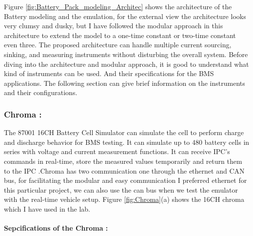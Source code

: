 Figure \ref{fig:Battery_Pack_modeling_Architec} shows the architecture of the Battery modeling and the emulation, for the external view the architecture looks very clumsy and dusky, but I have followed the modular approach in this architecture to extend the model to a one-time constant or two-time constant even three. The proposed architecture can handle multiple current sourcing, sinking, and measuring instruments without disturbing the overall system. Before diving into the architecture and modular approach, it is good to understand what kind of instruments can be used. And their specifications for the BMS applications. The following section can give brief information on the instruments and their configurations.

\subsubsection{Chroma :}
The 87001 16CH Battery Cell Simulator can simulate the cell to perform charge and discharge behavior for BMS testing. It can simulate up to 480 battery cells in series with voltage and current measurement functions. It can receive IPC's commands in real-time, store the measured values temporarily and return them to the IPC \cite{Chroma_UserManual}.Chroma has two communication one through the ethernet and CAN bus, for facilitating the modular and easy communication I preferred ethernet for this particular project, we can also use the can bus when we test the emulator with the real-time vehicle setup. Figure \ref{fig:Chroma}(a) shows the 16CH chroma which I have used in the lab.

\paragraph{Sepcifications of the Chroma :}

